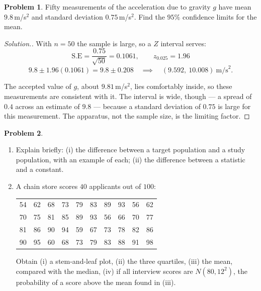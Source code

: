 \documentclass[11pt,a4paper]{article}
\theoremstyle{definition}
\newtheorem{problemx}{Problem}[section]
\newenvironment{problem}{\begin{problemx}}{\end{problemx}}
\newenvironment{solution}
  {\renewcommand{\qedsymbol}{}\begin{proof}[\textit{Solution}.]}
  {\end{proof}}
\begin{document}
\begin{problem}
Fifty measurements of the acceleration due to gravity $g$ have mean $9.8$\,m/s$^2$ and
standard deviation $0.75$\,m/s$^2$. Find the $95\%$ confidence limits for the mean.
\end{problem}

\begin{solution}
With $n=50$ the sample is large, so a $Z$ interval serves:
\[\text{S.E}=\frac{0.75}{\sqrt{50}}=0.1061,\qquad z_{0.025}=1.96\]
\[9.8\pm 1.96(0.1061)=9.8\pm 0.208
\quad\implies\quad (9.592,\ 10.008)\ \text{m/s}^2.\]

The accepted value of $g$, about $9.81$\,m/s$^2$, lies comfortably inside, so these
measurements are consistent with it. The interval is wide, though --- a spread of $0.4$ across
an estimate of $9.8$ --- because a standard deviation of $0.75$ is large for this
measurement. The apparatus, not the sample size, is the limiting factor.
\end{solution}

\begin{problem}
\begin{enumerate}
\item[(a).] Explain briefly: (i) the difference between a target population and a study
population, with an example of each; (ii) the difference between a statistic and a constant.
\item[(b).] A chain store scores $40$ applicants out of $100$:
\begin{table}[H]
\centering
\begin{tabular}{cccccccccc}
54 & 62 & 68 & 73 & 79 & 83 & 89 & 93 & 56 & 62\\
70 & 75 & 81 & 85 & 89 & 93 & 56 & 66 & 70 & 77\\
81 & 86 & 90 & 94 & 59 & 67 & 73 & 78 & 82 & 86\\
90 & 95 & 60 & 68 & 73 & 79 & 83 & 88 & 91 & 98\\
\end{tabular}
\end{table}
Obtain (i) a stem-and-leaf plot, (ii) the three quartiles, (iii) the mean, compared with the
median, (iv) if all interview scores are $N(80,12^2)$, the probability of a score above the
mean found in (iii).
\end{enumerate}
\end{problem}
\end{document}
